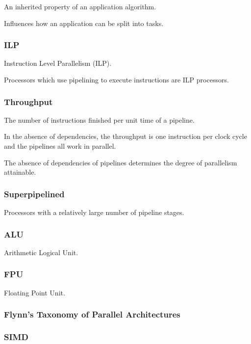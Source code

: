 \documentclass{article}
\begin{document}
An inherited property of an application algorithm.

Influences how an application can be split into tasks.

\subsubsection{ILP}

Instruction Level Parallelism (ILP).

Processors which use pipelining to execute instructions are ILP processors.

\subsubsection{Throughput}

The number of instructions finished per unit time of a pipeline.

In the absence of dependencies, the throughput is one instruction per clock cycle and the pipelines all work in parallel.

The absence of dependencies of pipelines determines the degree of parallelism attainable.

\subsubsection{Superpipelined}

Processors with a relatively large number of pipeline stages.

\subsubsection{ALU}

Arithmetic Logical Unit.

\subsubsection{FPU}

Floating Point Unit.

\subsubsection{Flynn's Taxonomy of Parallel Architectures}

\subsubsection{SIMD}
\end{document}
